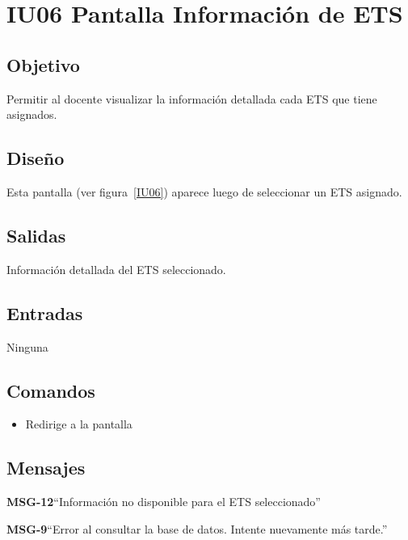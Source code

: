 \section{IU06 Pantalla Información de ETS}

\subsection{Objetivo}
	Permitir al docente visualizar la información detallada cada ETS que tiene asignados.
	
\subsection{Diseño}
	Esta pantalla  (ver figura~\ref{IU06}) aparece luego de seleccionar un ETS asignado. 


\subsection{Salidas}

	Información detallada del ETS seleccionado. 

\subsection{Entradas}
Ninguna

\subsection{Comandos}
\begin{itemize}
	\item {} Redirige a la pantalla 
\end{itemize}

\subsection{Mensajes}

\begin{Citemize}
	\item {\bf MSG-12}{``Información no disponible para el ETS seleccionado''}
	\item {\bf MSG-9}{``Error al consultar la base de datos. Intente nuevamente más tarde.''}
\end{Citemize}

